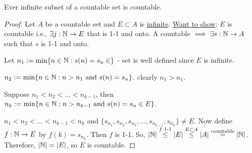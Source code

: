 \documentclass[]{article}
\begin{document}
\begin{theorem}
	Ever infinite subset of a countable set is countable.
\end{theorem}
\begin{proof}
	Let $A$ be a countable set and $E\subset A$ is \ul{infinite}.
	\ul{Want to show}: $E$ is countable i.e., $\exists j:\mathbb{N}\rightarrow E$ that is 1-1 and onto.
	A countable $\implies \exists s:\mathbb{N}\rightarrow A$ such that $s$ is 1-1 and onto.
	
	Let $n_1:=\min\{n\in \mathbb{N}: s(n) = s_n\in \}$ - set is well defined since $E$ is infinite.
	
	$n_2:=\min\{n\in\mathbb{N}: n>n_1 \text{ and } s(n) = s_n\}$. clearly $n_1>n_1$.

	Suppose $n_1<n_2 <\dots < n_{k-1}$, then $n_k:= \min\{n\in\mathbb{N}: n>n_{k-1} \text{ and } s(n) = s_n\in E\}$.

	$n_1<n_2<\dots<n_{k-1}<n_k$ and $\{s_{n_1}, s_{n_2}, s_{n_3},\dots,s_{n_{k-1}},s_{n_k} \} \neq E$.
	Now define $f:\mathbb{N} \rightarrow E$ by $f(k) = s_{n_k}$. Then $f$ is 1-1. So, $|\mathbb{N}| \overset{f\text{ 1-1}}{\leq} |E| \overset{E\subset A}{\leq} |A| \overset{\text{countable}}{=} |\mathbb{N}|$. Therefore, $|\mathbb{N}| = |E|$, so $E$ is countable.
\end{proof}
\end{document}

